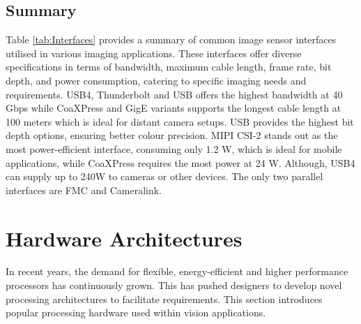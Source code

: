\subsection{Summary}


Table \ref{tab:Interfaces} provides a summary of common image sensor interfaces utilised in various imaging applications. These interfaces offer diverse specifications in terms of bandwidth, maximum cable length, frame rate, bit depth, and power consumption, catering to specific imaging needs and requirements. USB4, Thunderbolt and USB offers the highest bandwidth at 40 Gbps while CoaXPress and GigE variants supports the longest cable length at 100 meters which is ideal for distant camera setups. USB provides the highest bit depth options, ensuring better colour precision. MIPI CSI-2 stands out as the most power-efficient interface, consuming only 1.2 W, which is ideal for mobile applications, while CoaXPress requires the most power at 24 W. Although, USB4 can supply up to 240W to cameras or other devices.  The only two parallel interfaces are FMC and Cameralink.


\section{Hardware Architectures}
In recent years, the demand for flexible, energy-efficient and higher performance processors has continuously grown. This has pushed designers to develop novel processing architectures to facilitate requirements. This section introduces popular processing hardware used within vision applications.

